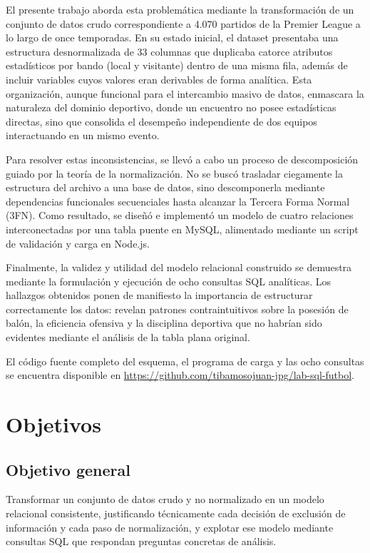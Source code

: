 \documentclass[conference]{IEEEtran}
\begin{document}
El presente trabajo aborda esta problemática mediante la transformación de un
conjunto de datos crudo correspondiente a 4.070 partidos de la Premier League a
lo largo de once temporadas. En su estado inicial, el dataset presentaba una
estructura desnormalizada de 33 columnas que duplicaba catorce atributos
estadísticos por bando (local y visitante) dentro de una misma fila, además de
incluir variables cuyos valores eran derivables de forma analítica. Esta
organización, aunque funcional para el intercambio masivo de datos, enmascara
la naturaleza del dominio deportivo, donde un encuentro no posee estadísticas
directas, sino que consolida el desempeño independiente de dos equipos
interactuando en un mismo evento.

Para resolver estas inconsistencias, se llevó a cabo un proceso de
descomposición guiado por la teoría de la normalización. No se buscó trasladar
ciegamente la estructura del archivo a una base de datos, sino descomponerla
mediante dependencias funcionales secuenciales hasta alcanzar la Tercera Forma
Normal (3FN). Como resultado, se diseñó e implementó un modelo de cuatro
relaciones interconectadas por una tabla puente en MySQL, alimentado mediante
un script de validación y carga en Node.js.

Finalmente, la validez y utilidad del modelo relacional construido se demuestra
mediante la formulación y ejecución de ocho consultas SQL analíticas. Los
hallazgos obtenidos ponen de manifiesto la importancia de estructurar
correctamente los datos: revelan patrones contraintuitivos sobre la posesión de
balón, la eficiencia ofensiva y la disciplina deportiva que no habrían sido
evidentes mediante el análisis de la tabla plana original.

El código fuente completo del esquema, el programa de carga y las ocho
consultas se encuentra disponible en
\url{https://github.com/tibamosojuan-jpg/lab-sql-futbol}.

\section{Objetivos}

\subsection{Objetivo general}

Transformar un conjunto de datos crudo y no normalizado en un modelo relacional
consistente, justificando técnicamente cada decisión de exclusión de
información y cada paso de normalización, y explotar ese modelo mediante
consultas SQL que respondan preguntas concretas de análisis.
\end{document}
